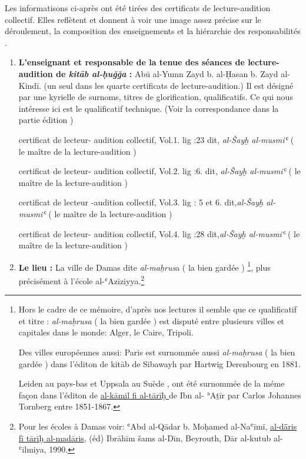 \documentclass[a4paper,12pt]{report}
\begin{document}
\begin{itemize}
\begin{enumerate}
Les informatisons ci-après ont été tirées des certificats de lecture-audition collectif. Elles reflètent et donnent à voir  une image assez précise sur le déroulement, la composition  des enseignements et la hiérarchie des responsabilités .  

\begin{enumerate}
    \item 	\textbf{L’enseignant et responsable de la tenue des séances de lecture-audition de \textit{kitāb al-ḥuǧǧa} :} Abū al-Yumn Zayd b. al-Ḥasan b. Zayd al-Kindī.  (un seul dans les quarte certificats de lecture-audition.)  Il est désigné par une kyrielle de surnoms, titres de glorification, qualificatifs. Ce qui  nous intéresse ici est le qualificatif technique. (Voir la correspondance dans la partie édition )

 certificat de  lecteur- audition collectif,  Vol.1. lig :23 dit,
\textit{al-Šayḫ al-musmiʿ } ( le maître de la lecture-audition )

 certificat de  lecteur- audition collectif,  Vol.2. lig :6. dit,
\textit{al-Šayḫ al-musmiʿ } ( le maître de la lecture-audition )

 certificat de  lecteur -audition collectif,  Vol.3. lig :  5 et 6. dit,\textit{al-Šayḫ al-musmiʿ } ( le maître de la lecture-audition )

  	 certificat de  lecteur- audition collectif,  Vol.4. lig :28 dit,\textit{al-Šayḫ al-musmiʿ } ( le maître de la lecture-audition )


    
\item \textbf{ Le lieu :} La ville de Damas dite \textit{al-maḥrus}a ( la bien gardée ) \footnote   { Hors le cadre de ce mémoire, d'après nos lectures il semble que ce qualificatif et titre :  \textit{al-maḥrusa} ( la bien gardée ) est disputé entre plusieurs villes et capitales dans le monde: Alger, le Caire, Tripoli. 

Des villes européennes aussi: 
Paris est surnommée aussi \textit{al-maḥrusa} ( la bien gardée ) dans l'éditon de  kitāb de Sibawayh par Hartwig Derenbourg en 1881.

Leiden au pays-bas  et Uppsala au Suède , ont été surnommée de la méme façon dans l'éditon de \underline {al-kāmil fi al-tārīḫ } de Ibn al- ʾAṯīr par  Carlos Johannes Tornberg entre 1851-1867.  }, plus précisément à  l’école al-ʿAzīziyya.\footnote{ Pour les écoles  à Damas voir: ʿAbd al-Qādar b. Moḥamed al-Naʿīmī, \underline {al-dā̄ris fī tārīḫ al-madāris}, (éd) Ibrāhīm šams al-Dīn, Beyrouth, Dār al-kutub al-ʿilmiya, 1990.  } 



\end{enumerate}
\end{enumerate}
\end{itemize}
\end{document}
